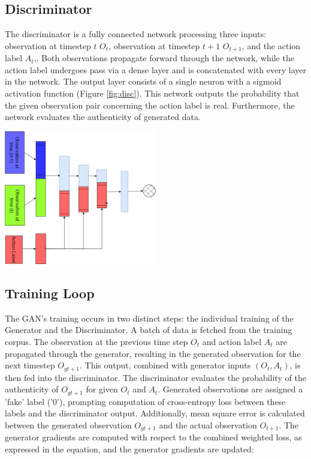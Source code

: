 \documentclass[12pt,twoside,a4paper,parskip]{scrbook} %
\begin{document}
\subsection{Discriminator}
The discriminator is a fully connected network processing three inputs: observation at timestep \(t\) \(O_t\), observation at timestep \(t+1\) \(O_{t+1}\), and the action label \(A_t\),. Both observations propagate forward through the network, while the action label undergoes pass via a dense layer and is concatenated with every layer in the network. The output layer consists of a single neuron with a sigmoid activation function (Figure \ref{fig:disc}). This network outputs the probability that the given observation pair concerning the action label is real. Furthermore, the network evaluates the authenticity of generated data.

\begin{minipage}[t]{\linewidth}
        \centering
        \includegraphics[width=0.5\textwidth]{Images/discriminator.png}
        \label{fig:disc}
        \vspace{-\baselineskip} %
    \end{minipage}
    \hfill
  
\subsection{Training Loop}
The GAN's training occurs in two distinct steps: the individual training of the Generator and the Discriminator. A batch of data is fetched from the training corpus. The observation at the previous time step \(O_t\) and action label \(A_t\) are propagated through the generator, resulting in the generated observation for the next timestep \(O_{gt+1}\). This output, combined with generator inputs \((O_t, A_t)\), is then fed into the discriminator. The discriminator evaluates the probability of the authenticity of \(O_{gt+1}\) for given \(O_t\) and \(A_t\). Generated observations are assigned a 'fake' label ('0'), prompting computation of cross-entropy loss between these labels and the discriminator output. Additionally, mean square error is calculated between the generated observation \(O_{gt+1}\) and the actual observation \(O_{t+1}\). The generator gradients are computed with respect to the combined weighted loss, as expressed in the equation, and the generator gradients are updated:
\end{document}
